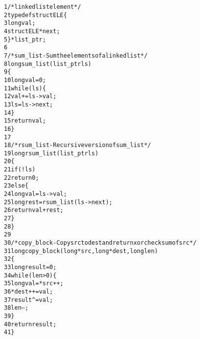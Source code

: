 \begin{alltt}
{\scriptsize   1} /* linked list element */
{\scriptsize   2} typedef struct ELE \verb:{:
{\scriptsize   3}     long val;
{\scriptsize   4}     struct ELE *next;
{\scriptsize   5} \verb:}: *list_ptr;
{\scriptsize   6} 
{\scriptsize   7} /* sum_list - Sum the elements of a linked list */
{\scriptsize   8} long sum_list(list_ptr ls)
{\scriptsize   9} \verb:{:
{\scriptsize  10}     long val = 0;
{\scriptsize  11}     while (ls) \verb:{:
{\scriptsize  12}         val += ls->val;
{\scriptsize  13}         ls = ls->next;
{\scriptsize  14}     \verb:}:
{\scriptsize  15}     return val;
{\scriptsize  16} \verb:}:
{\scriptsize  17} 
{\scriptsize  18} /* rsum_list - Recursive version of sum_list */
{\scriptsize  19} long rsum_list(list_ptr ls)
{\scriptsize  20} \verb:{:
{\scriptsize  21}     if (!ls)
{\scriptsize  22}         return 0;
{\scriptsize  23}     else \verb:{:
{\scriptsize  24}         long val = ls->val;
{\scriptsize  25}         long rest = rsum_list(ls->next);
{\scriptsize  26}         return val + rest;
{\scriptsize  27}     \verb:}:
{\scriptsize  28} \verb:}:
{\scriptsize  29} 
{\scriptsize  30} /* copy_block - Copy src to dest and return xor checksum of src */
{\scriptsize  31} long copy_block(long *src, long *dest, long len)
{\scriptsize  32} \verb:{:
{\scriptsize  33}     long result = 0;
{\scriptsize  34}     while (len > 0) \verb:{:
{\scriptsize  35}         long val = *src++;
{\scriptsize  36}         *dest++ = val;
{\scriptsize  37}         result ^= val;
{\scriptsize  38}         len--;
{\scriptsize  39}     \verb:}:
{\scriptsize  40}     return result;
{\scriptsize  41} \verb:}:
\end{alltt}
